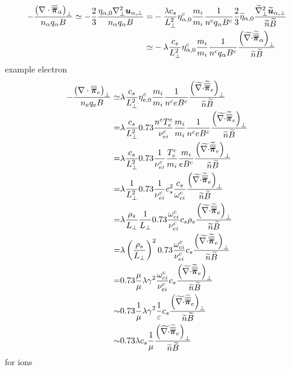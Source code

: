 \begin{align*}
- \frac{ \L(\div\te{\pi}_\a\R)_\perp }{n_\a  q_\a B}
\simeq
- \frac{2}{3}\frac{ \eta_{\a,0}\grad_\perp^2\ve{u}_{\a,\perp} }{n_\a  q_\a B}
=&
- \frac{\lambda c_s}{L_{\perp}^2}
\eta^c_{\a,0}
\frac{m_i}{m_i}
\frac{1}{n^c  q_\a B^c}
\frac{2}{3}
\wt{\eta}_{\a,0}
\frac{ \wt{\grad}_\perp^2\wt{\ve{u}}_{\a,\perp} }{\wt{n}\wt{B}}
\\
\simeq&
-
\lambda
\frac{c_s}{L_{\perp}^2}
\eta^c_{\a,0}
\frac{m_i}{m_i}
\frac{1}{n^c  q_\a B^c}
\frac{\L(\wt{\div}\wt{\te{\pi}}_\a\R)_\perp}{\wt{n}\wt{B}}
\end{align*}
%
example electron
%
\begin{align*}
- \frac{ \L(\div\te{\pi}_e\R)_\perp }{n_e  q_e B}
\simeq&
\lambda
\frac{c_s}{L_{\perp}^2}
\eta^c_{e,0}
\frac{m_i}{m_i}
\frac{1}{n^c  e B^c}
\frac{\L(\wt{\div}\wt{\te{\pi}}_e\R)_\perp}{\wt{n}\wt{B}}
\\
=&
\lambda
\frac{c_s}{L_{\perp}^2}
0.73\frac{n^cT_e^c}{\nu^c_{ei}}
\frac{m_i}{m_i}
\frac{1}{n^c  e B^c}
\frac{\L(\wt{\div}\wt{\te{\pi}}_e\R)_\perp}{\wt{n}\wt{B}}
\\
=&
\lambda
\frac{c_s}{L_{\perp}^2}
0.73\frac{1}{\nu^c_{ei}}
\frac{T_e^c}{m_i}
\frac{m_i}{ e B^c}
\frac{\L(\wt{\div}\wt{\te{\pi}}_e\R)_\perp}{\wt{n}\wt{B}}
\\
=&
\lambda
\frac{1}{L_{\perp}^2}
0.73\frac{1}{\nu^c_{ei}}
c_s^2
\frac{c_s}{\om^c_{ci}}
\frac{\L(\wt{\div}\wt{\te{\pi}}_e\R)_\perp}{\wt{n}\wt{B}}
\\
=&
\lambda
\frac{\rho_s}{L_{\perp}}
\frac{1}{L_{\perp}}
0.73\frac{\om^c_{ci}}{\nu^c_{ei}}
c_s\rho_s
\frac{\L(\wt{\div}\wt{\te{\pi}}_e\R)_\perp}{\wt{n}\wt{B}}
\\
=&
\lambda
\L(\frac{\rho_s}{L_{\perp}}\R)^2
0.73\frac{\om^c_{ci}}{\nu^c_{ei}}
c_s
\frac{\L(\wt{\div}\wt{\te{\pi}}_e\R)_\perp}{\wt{n}\wt{B}}
\\
=&
0.73
\frac{\mu}{\mu}
\lambda
\gamma^2
\frac{\om^c_{ci}}{\nu^c_{ei}}
c_s
\frac{\L(\wt{\div}\wt{\te{\pi}}_e\R)_\perp}{\wt{n}\wt{B}}
\\
\sim&
0.73
\frac{1}{\mu}
\lambda
\gamma^2
\frac{1}{\e}
c_s
\frac{\L(\wt{\div}\wt{\te{\pi}}_e\R)_\perp}{\wt{n}\wt{B}}
\\
\sim&
0.73
\lambda
c_s
\frac{1}{\mu}
\frac{\L(\wt{\div}\wt{\te{\pi}}_e\R)_\perp}{\wt{n}\wt{B}}
\end{align*}
%
for ions
%
